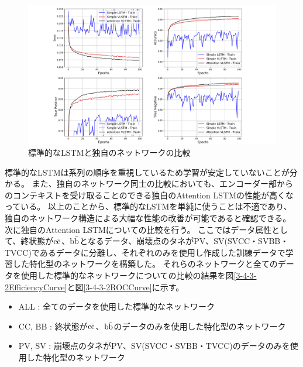 \begin{figure}[htbp]
 \centering
 \includegraphics[trim = 100 0 100 0, width=1.0\textwidth, clip]{Figure/3Networks/3-4-3-1LSTMvsVLSTM.png}
 \caption{標準的なLSTMと独自のネットワークの比較}
 \label{3-4-3-1LSTMvsVLSTM}
\end{figure}

標準的なLSTMは系列の順序を重視しているため学習が安定していないことが分かる。
また、独自のネットワーク同士の比較においても、エンコーダー部からのコンテキストを受け取ることのできる独自のAttention LSTMの性能が高くなっている。
以上のことから、標準的なLSTMを単純に使うことは不適であり、独自のネットワーク構造による大幅な性能の改善が可能であると確認できる。\\

次に独自のAttention LSTMについての比較を行う。
ここではデータ属性として、終状態が$\rm c\bar{c}$、$\rm b\bar{b}$となるデータ、崩壊点のタネがPV、SV(SVCC・SVBB・TVCC)であるデータに分離し、それぞれのみを使用し作成した訓練データで学習した特化型のネットワークを構築した。
それらのネットワークと全てのデータを使用した標準的なネットワークについての比較の結果を図\ref{3-4-3-2EfficiencyCurve}と図\ref{3-4-3-2ROCCurve}に示す。

\begin{itemize}
 \item ALL : 全てのデータを使用した標準的なネットワーク
 \item CC, BB : 終状態が$\rm c\bar{c}$、$\rm b\bar{b}$のデータのみを使用した特化型のネットワーク
 \item PV, SV : 崩壊点のタネがPV、SV(SVCC・SVBB・TVCC)のデータのみを使用した特化型のネットワーク
\end{itemize}

